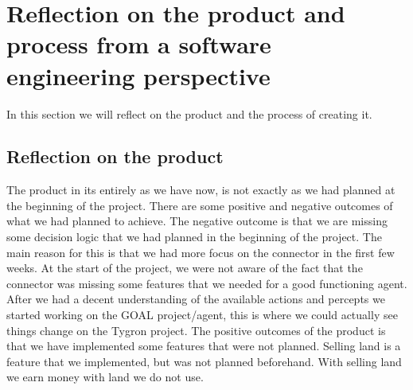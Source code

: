 \chapter{Reflection on the product and process from a software engineering perspective}
In this section we will reflect on the product and the process of creating it.

\section{Reflection on the product}
The product in its entirely as we have now, is not exactly as we had planned at the beginning of the project. There are some positive and negative outcomes of what we had planned to achieve. The negative outcome is that we are missing some decision logic that we had planned in the beginning of the project. The main reason for this is that we had more focus on the connector in the first few weeks. At the start of the project, we were not aware of the fact that the connector was missing some features that we needed for a good functioning agent. After we had a decent understanding of the available actions and percepts we started working on the GOAL project/agent, this is where we could actually see things change on the Tygron project.
The positive outcomes of the product is that we have implemented some features that were not planned. Selling land is a feature that we implemented, but was not planned beforehand. With selling land we earn money with land we do not use. 

